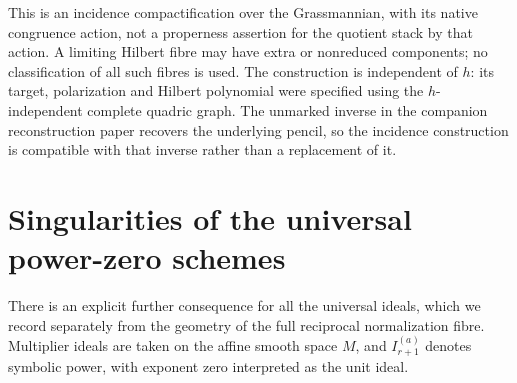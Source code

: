 \documentclass[11pt,reqno]{amsart}
\numberwithin{equation}{section}
\theoremstyle{definition}\newtheorem{definition}[theorem]{Definition}
\theoremstyle{remark}\newtheorem{remark}[theorem]{Remark}
\begin{document}
This is an incidence compactification over the Grassmannian, with its
native congruence action, not a properness assertion for the quotient
stack by that action. A limiting Hilbert fibre may have extra or
nonreduced components; no classification of all such fibres is used.
The construction is independent of $h$: its target, polarization and
Hilbert polynomial were specified using the $h$-independent complete
quadric graph. The unmarked inverse in the companion reconstruction
paper recovers the underlying pencil, so the incidence construction is
compatible with that inverse rather than a replacement of it.

\section{Singularities of the universal power-zero schemes}
\label{sec:power-multiplier-v157}
There is an explicit further consequence for all the universal ideals,
which we record separately from the geometry of the full reciprocal
normalization fibre. Multiplier ideals are taken on the affine smooth
space $M$, and $I_{r+1}^{(a)}$ denotes symbolic power, with exponent
zero interpreted as the unit ideal.
\end{document}
